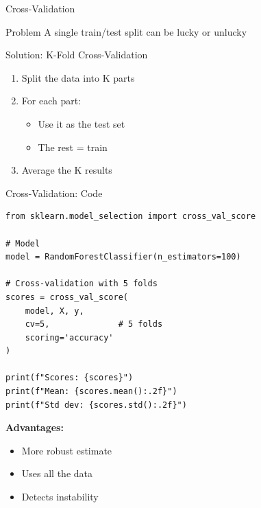 \documentclass[aspectratio=169]{beamer}
\begin{document}
\begin{frame}{Cross-Validation}
\begin{block}{Problem}
A single train/test split can be lucky or unlucky
\end{block}

\begin{block}{Solution: K-Fold Cross-Validation}
\begin{enumerate}
    \item Split the data into K parts
    \item For each part:
    \begin{itemize}
        \item Use it as the test set
        \item The rest = train
    \end{itemize}
    \item Average the K results
\end{enumerate}
\end{block}


\begin{center}
\end{center}
\end{frame}

\begin{frame}[fragile]{Cross-Validation: Code}
\begin{lstlisting}
from sklearn.model_selection import cross_val_score

# Model
model = RandomForestClassifier(n_estimators=100)

# Cross-validation with 5 folds
scores = cross_val_score(
    model, X, y, 
    cv=5,              # 5 folds
    scoring='accuracy'
)

print(f"Scores: {scores}")
print(f"Mean: {scores.mean():.2f}")
print(f"Std dev: {scores.std():.2f}")
\end{lstlisting}

\vspace{0.3cm}
\textbf{Advantages:}
\begin{itemize}
    \item More robust estimate
    \item Uses all the data
    \item Detects instability
\end{itemize}
\end{frame}
\end{document}

